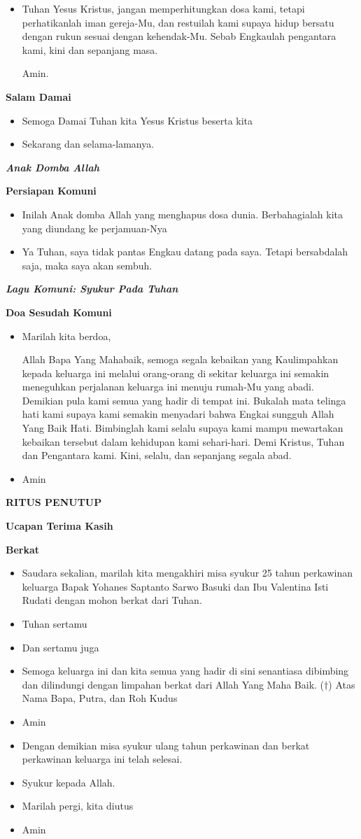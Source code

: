 \documentclass[12pt,two pages]{scrbook}
\makeatletter
\newcommand{\judul}[1]{%
  {\parindent \z@ \centering \normalfont
    \interlinepenalty\@M \Large \bfseries #1\par\nobreak \vskip 20\p@ }}
\newcommand{\subjudul}[1]{%
  {\parindent \z@ \normalfont
    \interlinepenalty\@M \bfseries #1\par\nobreak \vskip 20\p@ }}
\newcommand{\lagu}[1]{%
  {\parindent \z@ \normalfont
    \interlinepenalty\@M \bfseries \emph{#1}\par\nobreak \vskip 20\p@ }}
\newcommand{\BU}[1]{\begin{itemize} \item[U:] #1 \end{itemize}}
\newcommand{\BI}[1]{\begin{itemize} \item[I:] #1 \end{itemize}}
\newcommand{\ultah}{25 }
\newcommand{\suami}{Yohanes Saptanto Sarwo Basuki }
\newcommand{\istri}{Valentina Isti Rudati }
\makeatother
\begin{document}
\BU{Tuhan Yesus Kristus, jangan memperhitungkan dosa kami, tetapi perhatikanlah iman gereja-Mu, dan restuilah kami supaya hidup bersatu dengan rukun sesuai dengan kehendak-Mu. Sebab Engkaulah pengantara kami, kini dan sepanjang masa.

Amin.}

\subjudul{Salam Damai}

\BI{Semoga Damai Tuhan kita Yesus Kristus beserta kita}

\BU{Sekarang dan selama-lamanya.}

\lagu{Anak Domba Allah}

\subjudul{Persiapan Komuni}

\BI{Inilah Anak domba Allah yang menghapus dosa dunia. Berbahagialah kita yang diundang ke perjamuan-Nya}
\BU{Ya Tuhan, saya tidak pantas Engkau datang pada saya. Tetapi bersabdalah saja, maka saya akan sembuh.}

\lagu{Lagu Komuni: Syukur Pada Tuhan}

\subjudul{Doa Sesudah Komuni}

\BI{Marilah kita berdoa,

Allah Bapa Yang Mahabaik, semoga segala kebaikan yang Kaulimpahkan kepada keluarga ini melalui orang-orang di sekitar keluarga ini semakin meneguhkan perjalanan keluarga ini menuju rumah-Mu yang abadi. Demikian pula kami semua yang hadir di tempat ini. Bukalah mata telinga hati kami supaya kami semakin menyadari bahwa Engkai sungguh Allah Yang Baik Hati. Bimbinglah kami selalu supaya kami mampu mewartakan kebaikan tersebut dalam kehidupan kami sehari-hari. Demi Kristus, Tuhan dan Pengantara kami. Kini, selalu, dan sepanjang segala abad.}

\BU{Amin}

\judul{RITUS PENUTUP}

\subjudul{Ucapan Terima Kasih}

\subjudul{Berkat}

\BI{Saudara sekalian, marilah kita mengakhiri misa syukur \ultah tahun perkawinan keluarga Bapak \suami dan Ibu \istri dengan mohon berkat dari Tuhan.}
\BI{Tuhan sertamu}
\BU{Dan sertamu juga}
\BI{Semoga keluarga ini dan kita semua yang hadir di sini senantiasa dibimbing dan dilindungi dengan limpahan berkat dari Allah Yang Maha Baik. ($\dagger$) Atas Nama Bapa, Putra, dan Roh Kudus}
\BU{Amin}
\BI{Dengan demikian misa syukur ulang tahun perkawinan dan berkat perkawinan keluarga ini telah selesai.}
\BU{Syukur kepada Allah.}
\BI{Marilah pergi, kita diutus}
\BU{Amin}
\end{document}
